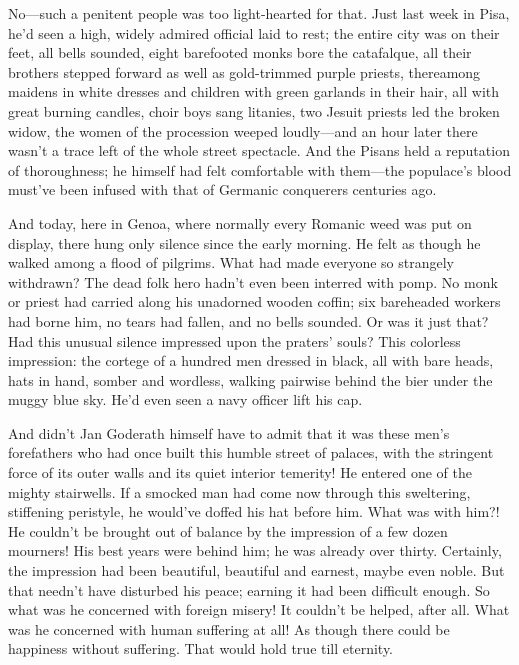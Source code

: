 \documentclass[12pt,a4paper]{article}
\begin{document}
No—such a penitent people was too light-hearted for that. Just last week in Pisa, he’d seen a high, widely admired official laid to rest; the entire city was on their feet, all bells sounded, eight barefooted monks bore the catafalque, all their brothers stepped forward as well as gold-trimmed purple priests, thereamong maidens in white dresses and children with green garlands in their hair, all with great burning candles, choir boys sang litanies, two Jesuit priests led the broken widow, the women of the procession weeped loudly—and an hour later there wasn’t a trace left of the whole street spectacle. And the Pisans held a reputation of thoroughness; he himself had felt comfortable with them—the populace’s blood must’ve been infused with that of Germanic conquerers centuries ago.

And today, here in Genoa, where normally every Romanic weed was put on display, there hung only silence since the early morning. He felt as though he walked among a flood of pilgrims. What had made everyone so strangely withdrawn? The dead folk hero hadn’t even been interred with pomp. No monk or priest had carried along his unadorned wooden coffin; six bareheaded workers had borne him, no tears had fallen, and no bells sounded. Or was it just that? Had this unusual silence impressed upon the praters’ souls? This colorless impression: the cortege of a hundred men dressed in black, all with bare heads, hats in hand, somber and wordless, walking pairwise behind the bier under the muggy blue sky. He’d even seen a navy officer lift his cap.

And didn’t Jan Goderath himself have to admit that it was these men’s forefathers who had once built this humble street of palaces, with the stringent force of its outer walls and its quiet interior temerity! He entered one of the mighty stairwells. If a smocked man had come now through this sweltering, stiffening peristyle, he would’ve doffed his hat before him. What was with him?! He couldn’t be brought out of balance by the impression of a few dozen mourners! His best years were behind him; he was already over thirty. Certainly, the impression had been beautiful, beautiful and earnest, maybe even noble. But that needn’t have disturbed his peace; earning it had been difficult enough. So what was he concerned with foreign misery! It couldn’t be helped, after all. What was he concerned with human suffering at all! As though there could be happiness without suffering. That would hold true till eternity.
\end{document}
